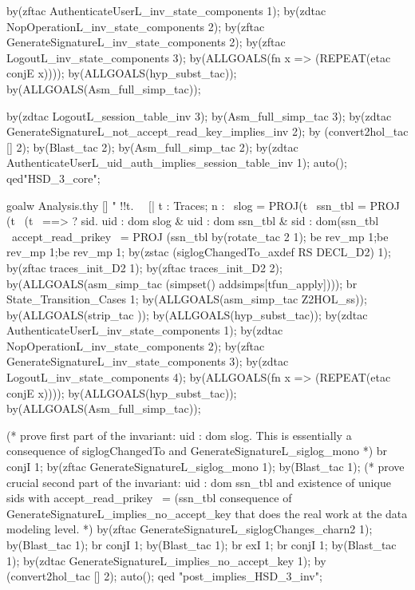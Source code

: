 \documentclass[a4paper,pdftex]{article}
\newenvironment{holz-ml}{\comment}{\endcomment}
\begin{document}
\begin{holz-ml}
  by(zftac AuthenticateUserL_inv_state_components 1);
  by(zdtac NopOperationL_inv_state_components 2);
  by(zftac GenerateSignatureL_inv_state_components 2);
  by(zftac LogoutL_inv_state_components 3);
  by(ALLGOALS(fn x => (REPEAT(etac conjE x))));
  by(ALLGOALS(hyp_subst_tac));
  by(ALLGOALS(Asm_full_simp_tac));
  
  by(zdtac LogoutL_session_table_inv 3);
  by(Asm_full_simp_tac 3);
  by(zdtac GenerateSignatureL_not_accept_read_key_implies_inv 2);
  by (convert2hol_tac [] 2);
  by(Blast_tac 2);
  by(Asm_full_simp_tac 2);
  by(zdtac AuthenticateUserL_uid_auth_implies_session_table_inv 1);
  auto();
qed"HSD_3_core";


goalw Analysis.thy []
" !!t.                                                                               \         
\ [| t : Traces; n : %
\    slog = PROJ(t %
\    ssn_tbl = PROJ (t %
\    (t %
\ ==> ? sid. uid : dom slog & uid : dom ssn_tbl & sid : dom(ssn_tbl %
\            accept_read_prikey ~= PROJ (ssn_tbl %
by(rotate_tac 2 1);
be rev_mp 1;be rev_mp 1;be rev_mp 1;
by(zstac (siglogChangedTo_axdef RS DECL_D2) 1);
by(zftac traces_init_D2 1);
by(zftac traces_init_D2 2);
by(ALLGOALS(asm_simp_tac (simpset() addsimps[tfun_apply])));
br State_Transition_Cases 1;
by(ALLGOALS(asm_simp_tac Z2HOL_ss));
by(ALLGOALS(strip_tac ));
by(ALLGOALS(hyp_subst_tac));
by(zdtac AuthenticateUserL_inv_state_components 1);
by(zdtac NopOperationL_inv_state_components 2);
by(zftac GenerateSignatureL_inv_state_components 3);
by(zdtac LogoutL_inv_state_components 4);
by(ALLGOALS(fn x => (REPEAT(etac conjE x))));
by(ALLGOALS(hyp_subst_tac));
by(ALLGOALS(Asm_full_simp_tac));

(* prove first part of the invariant:
   uid : dom slog. This is essentially a consequence of 
   siglogChangedTo and  GenerateSignatureL_siglog_mono *)
br conjI 1;
by(zftac GenerateSignatureL_siglog_mono 1);
by(Blast_tac 1);
(* prove crucial second part of the invariant:
   uid : dom ssn_tbl and existence of unique sids with
   accept_read_prikey ~= (ssn_tbl %
   consequence of GenerateSignatureL_implies_no_accept_key that does
   the real work at the data modeling level. *)
by(zftac GenerateSignatureL_siglogChanges_charn2 1);
by(Blast_tac 1);
br conjI 1;
by(Blast_tac 1);
br exI 1;
br conjI 1;
by(Blast_tac 1);
by(zdtac GenerateSignatureL_implies_no_accept_key 1);
by (convert2hol_tac [] 2);
auto();
qed "post_implies_HSD_3_inv";




\end{holz-ml}
\end{document}
